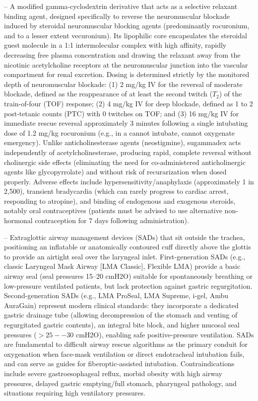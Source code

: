 -- A modified gamma-cyclodextrin derivative that acts as a selective relaxant binding agent, designed specifically to reverse the neuromuscular blockade induced by steroidal neuromuscular blocking agents (predominantly rocuronium, and to a lesser extent vecuronium). Its lipophilic core encapsulates the steroidal guest molecule in a 1:1 intermolecular complex with high affinity, rapidly decreasing free plasma concentration and drawing the relaxant away from the nicotinic acetylcholine receptors at the neuromuscular junction into the vascular compartment for renal excretion. Dosing is determined strictly by the monitored depth of neuromuscular blockade: (1) 2 mg/kg IV for the reversal of moderate blockade, defined as the reappearance of at least the second twitch ($T_2$) of the train-of-four (TOF) response; (2) 4 mg/kg IV for deep blockade, defined as 1 to 2 post-tetanic counts (PTC) with 0 twitches on TOF; and (3) 16 mg/kg IV for immediate rescue reversal approximately 3 minutes following a single intubating dose of 1.2 mg/kg rocuronium (e.g., in a cannot intubate, cannot oxygenate emergency). Unlike anticholinesterase agents (neostigmine), sugammadex acts independently of acetylcholinesterase, producing rapid, complete reversal without cholinergic side effects (eliminating the need for co-administered anticholinergic agents like glycopyrrolate) and without risk of recurarization when dosed properly. Adverse effects include hypersensitivity/anaphylaxis (approximately 1 in 2,500), transient bradycardia (which can rarely progress to cardiac arrest, responding to atropine), and binding of endogenous and exogenous steroids, notably oral contraceptives (patients must be advised to use alternative non-hormonal contraception for 7 days following administration).

-- Extraglottic airway management devices (SADs) that sit outside the trachea, positioning an inflatable or anatomically contoured cuff directly above the glottis to provide an airtight seal over the laryngeal inlet. First-generation SADs (e.g., classic Laryngeal Mask Airway [LMA Classic], Flexible LMA) provide a basic airway seal (seal pressures 15--20 cmH2O) suitable for spontaneously breathing or low-pressure ventilated patients, but lack protection against gastric regurgitation. Second-generation SADs (e.g., LMA ProSeal, LMA Supreme, i-gel, Ambu AuraGain) represent modern clinical standards: they incorporate a dedicated gastric drainage tube (allowing decompression of the stomach and venting of regurgitated gastric contents), an integral bite block, and higher mucosal seal pressures ($>25--30$ cmH2O), enabling safe positive-pressure ventilation. SADs are fundamental to difficult airway rescue algorithms as the primary conduit for oxygenation when face-mask ventilation or direct endotracheal intubation fails, and can serve as guides for fiberoptic-assisted intubation. Contraindications include severe gastroesophageal reflux, morbid obesity with high airway pressures, delayed gastric emptying/full stomach, pharyngeal pathology, and situations requiring high ventilatory pressures.

